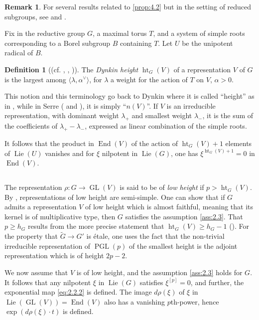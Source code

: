 \documentclass[11pt,a4paper]{article}
\theoremstyle{plain}
\theoremstyle{definition}
\newtheorem{definition}[theorem]{Definition}
\newtheorem{remark}[theorem]{Remark}
\DeclareMathOperator{\End}{End}
\DeclareMathOperator{\Lie}{Lie}
\DeclareMathOperator{\GL}{GL}
\DeclareMathOperator{\PGL}{PGL}
\DeclareMathOperator{\htG}{ht}
\begin{document}
\begin{remark} \label{rem:4.3}
For several results related to \ref{prop:4.2} but in the setting of reduced subgroups, see \cite[Theorem~3.10]{BMR1} and \cite[Theorem~1.1 and Corollary~3.7]{BMR2}.
\end{remark}

Fix in the reductive group $G$, a maximal torus $T$, and a system of simple roots corresponding to a Borel subgroup $B$ containing $T$. Let $U$ be the unipotent radical of $B$.

\begin{definition}[{(cf. \cite{Dy}, \cite{S1}, \cite{IMP})}] \label{def:4.4}
The \emph{Dynkin height} $\htG_G(V)$ of a representation $V$ of $G$ is the largest among $\langle \lambda, \alpha^\vee \rangle$, for $\lambda$ a weight for the action of $T$ on $V$, $\alpha > 0$.
\end{definition}

This notion and this terminology go back to Dynkin \cite[pages~331--332]{Dy} where it is called ``height'' as in \cite{IMP}, while in Serre (\cite{S1} and \cite{S2}), it is simply ``$n(V)$''. If $V$ is an irreducible representation, with dominant weight $\lambda_+$ and smallest weight $\lambda_-$, it is the sum of the coefficients of $\lambda_+ - \lambda_-$, expressed as linear combination of the simple roots.

It follows that the product in $\End(V)$ of the action of $\htG_G(V) + 1$ elements of $\Lie(U)$ vanishes and for $\xi$ nilpotent in $\Lie(G)$, one has $\xi^{\htG_G(V)+1} = 0$ in $\End(V)$.

\subsection{} \label{sec:4.5}
The representation $\rho : G \to \GL(V)$ is said to be of \emph{low height} if $p > \htG_G(V)$. By \cite[Theorem~6, page~25]{S2}, representations of low height are semi-simple. One can show that if $G$ admits a representation $V$ of low height which is almost faithful, meaning that its kernel is of multiplicative type, then $G$ satisfies the assumption \ref{ass:2.3}. That $p \geq h_G$ results from the more precise statement that $\htG_G(V) \geq h_G - 1$ (\cite[(5.2.4), page~213]{S3}). For the property that $\tilde{G} \to G'$ is \'etale, one uses the fact that the non-trivial irreducible representation of $\PGL(p)$ of the smallest height is the adjoint representation which is of height $2p - 2$.

We now assume that $V$ is of low height, and the assumption \ref{ass:2.3} holds for $G$. It follows that any nilpotent $\xi$ in $\Lie(G)$ satisfies $\xi^{[p]} = 0$, and further, the exponential map \eqref{eq:2.2.2} is defined. The image $d\rho(\xi)$ of $\xi$ in $\Lie(\GL(V)) = \End(V)$ also has a vanishing $p$th-power, hence $\exp(d\rho(\xi) \cdot t)$ is defined.
\end{document}
